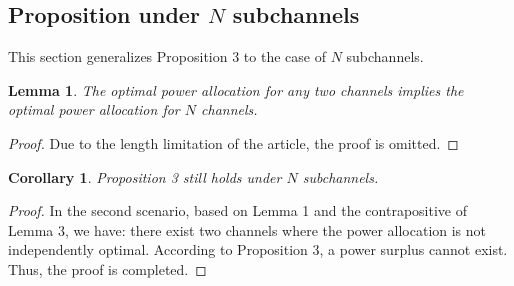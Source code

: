 \documentclass[lettersize,journal]{IEEEtran}
\newtheorem{corollary}{Corollary}
\newtheorem{lemma}{Lemma}  %
\begin{document}
	\subsection*{Proposition under \( N \) subchannels}
	This section generalizes Proposition 3 to the case of \( N \) subchannels.
	\begin{lemma}
		The optimal power allocation for any two channels implies the optimal power allocation for \( N \) channels.
	\end{lemma}
	\begin{proof}
		Due to the length limitation of the article, the proof is omitted.
	\end{proof}
	\begin{corollary}
		Proposition 3 still holds under \( N \) subchannels.
	\end{corollary}
	\begin{proof}
		In the second scenario, based on Lemma 1 and the contrapositive of Lemma 3, we have: there exist two channels where the power allocation is not independently optimal. According to Proposition 3, a power surplus cannot exist. Thus, the proof is completed.
	\end{proof}
	
	


\end{document}
